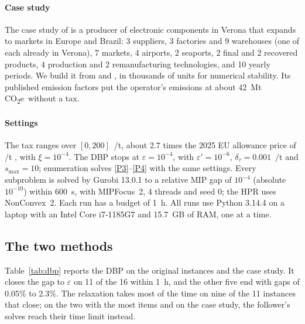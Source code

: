 \documentclass[review,11pt,nonatbib]{elsarticle}
\theoremstyle{remark}
\newcommand{\EUR}{\texteuro}
\newcommand{\CO}{CO\textsubscript{2}e}
\begin{document}
\paragraph{Case study} The case study of \textcite{mota2018sustainable} is a producer of electronic components in Verona that expands to markets in Europe and Brazil: 3 suppliers, 3 factories and 9 warehouses (one of each already in Verona), 7 markets, 4 airports, 2 seaports, 2 final and 2 recovered products, 4 production and 2 remanufacturing technologies, and 10 yearly periods. We build it from \textcite{mota2018sustainable} and \textcite{tautenhain2021data}, in thousands of units for numerical stability. Its published emission factors put the operator's emissions at about 42~Mt \CO\ without a tax.

\paragraph{Settings}\label{sec:settings} The tax ranges over $[0, 200]$~\EUR/t, about 2.7 times the 2025 EU allowance price of \EUR74/t \parencite{esma2026carbon}, with $\xi = 10^{-4}$. The DBP stops at $\varepsilon = 10^{-4}$, with $\varepsilon' = 10^{-6}$, $\delta_\tau = 0.001$~\EUR/t and $s_{\max} = 10$; enumeration solves \eqref{P3}--\eqref{P4} with the same settings. Every subproblem is solved by Gurobi 13.0.1 to a relative MIP gap of $10^{-4}$ (absolute $10^{-10}$) within 600~s, with MIPFocus~2, 4 threads and seed 0; the HPR uses NonConvex~2. Each run has a budget of 1~h. All runs use Python 3.14.4 on a laptop with an Intel Core i7-1185G7 and 15.7~GB of RAM, one at a time.

\subsection{The two methods}\label{sec:methods-results}

Table~\ref{tab:dbp} reports the DBP on the original instances and the case study. It closes the gap to $\varepsilon$ on 11 of the 16 within 1~h, and the other five end with gaps of 0.05\% to 2.3\%. The relaxation takes most of the time on nine of the 11 instances that close; on the two with the most items and on the case study, the follower's solves reach their time limit instead.
\end{document}
